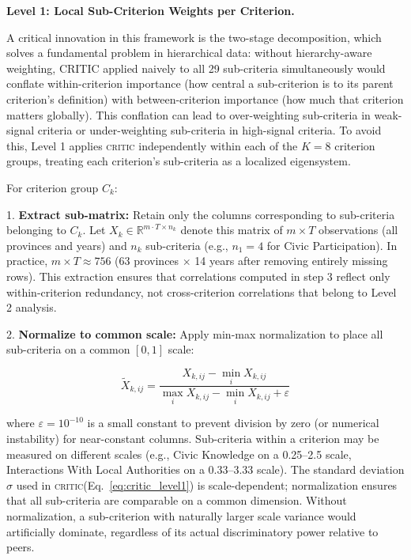 \documentclass[12pt,a4paper]{article}
\newcommand{\CRITIC}{\textsc{critic}\xspace}
\begin{document}
\textbf{Level 1: Local Sub-Criterion Weights per Criterion.} 

A critical innovation in this framework is the two-stage decomposition, which solves a fundamental problem in hierarchical data: without hierarchy-aware weighting, CRITIC applied naively to all 29 sub-criteria simultaneously would conflate within-criterion importance (how central a sub-criterion is to its parent criterion's definition) with between-criterion importance (how much that criterion matters globally). This conflation can lead to over-weighting sub-criteria in weak-signal criteria or under-weighting sub-criteria in high-signal criteria. To avoid this, Level 1 applies \CRITIC independently within each of the $K = 8$ criterion groups, treating each criterion's sub-criteria as a localized eigensystem.

For criterion group $C_k$:

1. \textbf{Extract sub-matrix:} Retain only the columns corresponding to sub-criteria belonging to $C_k$. Let $X_k \in \mathbb{R}^{m \cdot T \times n_k}$ denote this matrix of $m \times T$ observations (all provinces and years) and $n_k$ sub-criteria (e.g., $n_1 = 4$ for Civic Participation). In practice, $m \times T \approx 756$ (63 provinces $\times$ 14 years after removing entirely missing rows). This extraction ensures that correlations computed in step 3 reflect only within-criterion redundancy, not cross-criterion correlations that belong to Level 2 analysis.

2. \textbf{Normalize to common scale:} Apply min-max normalization to place all sub-criteria on a common $[0, 1]$ scale:

\begin{equation}
\label{eq:minmax_norm}
\tilde{X}_{k,ij} = \frac{X_{k,ij} - \min_i X_{k,ij}}{\max_i X_{k,ij} - \min_i X_{k,ij} + \varepsilon}
\end{equation}

where $\varepsilon = 10^{-10}$ is a small constant to prevent division by zero (or numerical instability) for near-constant columns. Sub-criteria within a criterion may be measured on different scales (e.g., Civic Knowledge on a 0.25--2.5 scale, Interactions With Local Authorities on a 0.33--3.33 scale). The standard deviation $\sigma$ used in \CRITIC (Eq.~\eqref{eq:critic_level1}) is scale-dependent; normalization ensures that all sub-criteria are comparable on a common dimension. Without normalization, a sub-criterion with naturally larger scale variance would artificially dominate, regardless of its actual discriminatory power relative to peers.
\end{document}
